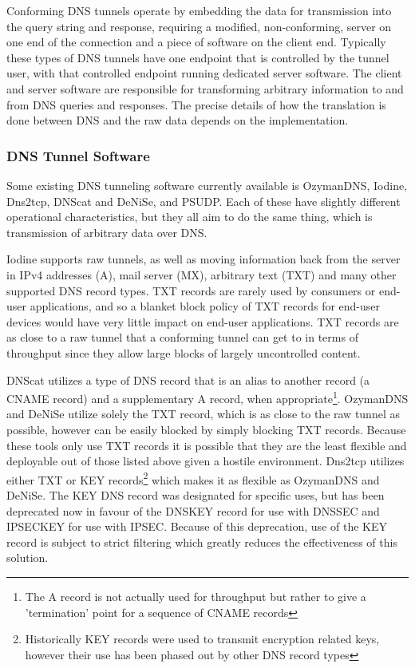 \documentclass[12pt]{report}
\theoremstyle{remark}
\theoremstyle{definition}
\theoremstyle{definition}
\theoremstyle{definition}
\begin{document}
Conforming DNS tunnels operate by embedding the data for transmission into the
query string and response, requiring a modified, non-conforming, server on one
end of the connection and a piece of software on the client end. Typically these
types of DNS tunnels have one endpoint that is controlled by the tunnel user,
with that controlled endpoint running dedicated server software. The client and
server software are responsible for transforming arbitrary information to and
from DNS queries and responses. The precise details of how the translation is
done between DNS and the raw data depends on the implementation.

\subsubsection{DNS Tunnel Software}
\label{tunnels-existing}
Some existing DNS tunneling software currently available is OzymanDNS\cite{ozymandnssrc},
Iodine\cite{iodinesrc}, Dns2tcp\cite{dns2tcpsrc}, DNScat\cite{dnscatsrc} and
DeNiSe\cite{denisesrc}, and PSUDP\cite{psudpsrc}. Each of these have slightly
different operational characteristics, but they all aim to do the same thing,
which is transmission of arbitrary data over DNS.

Iodine supports raw tunnels, as well as moving information back from the server
in IPv4 addresses (A), mail server (MX), arbitrary text (TXT) and many other
supported DNS record types. TXT records are rarely used by consumers or end-user
applications, and so a blanket block policy of TXT records for end-user devices
would have very little impact on end-user applications. TXT records are as close
to a raw tunnel that a conforming tunnel can get to in terms of throughput since
they allow large blocks of largely uncontrolled content.

DNScat utilizes a type of DNS record that is an alias to another record (a CNAME
record) and a supplementary A record, when appropriate\footnote{The A record is
not actually used for throughput but rather to give a 'termination' point for a
sequence of CNAME records}. OzymanDNS and DeNiSe utilize solely the TXT record,
which is as close to the raw tunnel as possible, however can be easily blocked
by simply blocking TXT records. Because these tools only use TXT records it is
possible that they are the least flexible and deployable out of those listed
above given a hostile environment. Dns2tcp utilizes either TXT or KEY
records\footnote{Historically KEY records were used to transmit encryption
related keys, however their use has been phased out by other DNS record types}
which makes it as flexible as OzymanDNS and DeNiSe. The KEY DNS record was
designated for specific uses\cite{rfc2931}, but has been deprecated
now\cite{rfc3445} in favour of the DNSKEY record for use with
DNSSEC\cite{rfc3755} and IPSECKEY for use with IPSEC\cite{rfc4025}. Because of
this deprecation, use of the KEY record is subject to strict filtering which
greatly reduces the effectiveness of this solution.
\end{document}
